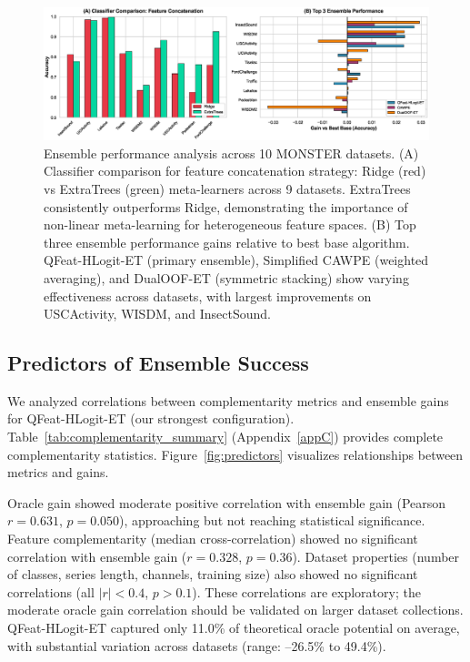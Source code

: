 \documentclass[pdflatex,sn-basic]{sn-jnl}           %
\theoremstyle{thmstyleone}%
\theoremstyle{thmstyletwo}%
\theoremstyle{thmstylethree}%
\begin{document}
\begin{figure}[t]
\centering
\includegraphics[width=\textwidth]{figure2_ensemble_performance}
\caption{Ensemble performance analysis across 10 MONSTER datasets. (A) Classifier comparison for feature concatenation strategy: Ridge (red) vs ExtraTrees (green) meta-learners across 9 datasets. ExtraTrees consistently outperforms Ridge, demonstrating the importance of non-linear meta-learning for heterogeneous feature spaces. (B) Top three ensemble performance gains relative to best base algorithm. QFeat-HLogit-ET (primary ensemble), Simplified CAWPE (weighted averaging), and DualOOF-ET (symmetric stacking) show varying effectiveness across datasets, with largest improvements on USCActivity, WISDM, and InsectSound.}\label{fig:ensemble}
\end{figure}

\subsection{Predictors of Ensemble Success}\label{subsec:predictors}

We analyzed correlations between complementarity metrics and ensemble gains for QFeat-HLogit-ET (our strongest configuration). Table~\ref{tab:complementarity_summary} (Appendix~\ref{appC}) provides complete complementarity statistics. Figure~\ref{fig:predictors} visualizes relationships between metrics and gains.

Oracle gain showed moderate positive correlation with ensemble gain (Pearson $r=0.631$, $p=0.050$), approaching but not reaching statistical significance. Feature complementarity (median cross-correlation) showed no significant correlation with ensemble gain ($r=0.328$, $p=0.36$). Dataset properties (number of classes, series length, channels, training size) also showed no significant correlations (all $|r| < 0.4$, $p > 0.1$). These correlations are exploratory; the moderate oracle gain correlation should be validated on larger dataset collections. QFeat-HLogit-ET captured only 11.0\% of theoretical oracle potential on average, with substantial variation across datasets (range: --26.5\% to 49.4\%).
\end{document}
